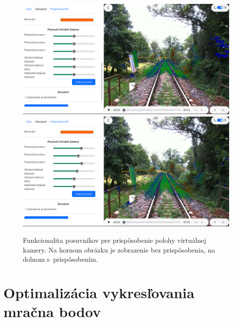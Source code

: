 \begin{figure}[h]
    \centering
    \includegraphics[width=0.9\linewidth]{text_prace/obrazky-figures/posuvniky1.png}
    \includegraphics[width=0.9\linewidth]{text_prace/obrazky-figures/posuvniky2.png}
    \caption[Funkcionalita posuvníkov pre prispôsobenie polohy virtuálnej kamery.]{Funkcionalita posuvníkov pre prispôsobenie polohy virtuálnej kamery. Na hornom obrázku je zobrazenie bez prispôsobenia, na dolnom s~prispôsobením.}
    \label{fig:posuvniky}
\end{figure}

\section{Optimalizácia vykresľovania mračna bodov}

